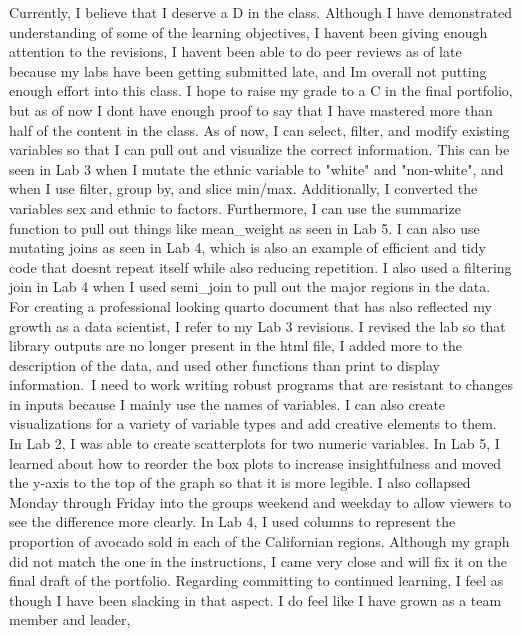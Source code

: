 \documentclass[
  letterpaper,
  DIV=11,
  numbers=noendperiod]{scrartcl}
\begin{document}
Currently, I believe that I deserve a D in the class. Although I have
demonstrated understanding of some of the learning objectives, I
haven\textquotesingle t been giving enough attention to the revisions, I
haven\textquotesingle t been able to do peer reviews as of late because
my labs have been getting submitted late, and I\textquotesingle m
overall not putting enough effort into this class. I hope to raise my
grade to a C in the final portfolio, but as of now I
don\textquotesingle t have enough proof to say that I have mastered more
than half of the content in the class. As of now, I can select, filter,
and modify existing variables so that I can pull out and visualize the
correct information. This can be seen in Lab 3 when I mutate the ethnic
variable to "white" and "non-white", and when I use filter, group by,
and slice min/max. Additionally, I converted the variables sex and
ethnic to factors. Furthermore, I can use the summarize function to pull
out things like mean\_weight as seen in Lab 5. I can also use mutating
joins as seen in Lab 4, which is also an example of efficient and tidy
code that doesn\textquotesingle t repeat itself while also reducing
repetition. I also used a filtering join in Lab 4 when I used semi\_join
to pull out the major regions in the data. For creating a professional
looking quarto document that has also reflected my growth as a data
scientist, I refer to my Lab 3 revisions. I revised the lab so that
library outputs are no longer present in the html file, I added more to
the description of the data, and used other functions than print to
display information.~I need to work writing robust programs that are
resistant to changes in inputs because I mainly use the names of
variables. I can also create visualizations for a variety of variable
types and add creative elements to them. In Lab 2, I was able to create
scatterplots for two numeric variables. In Lab 5, I learned about how to
reorder the box plots to increase insightfulness and moved the y-axis to
the top of the graph so that it is more legible. I also collapsed Monday
through Friday into the groups
\textquotesingle weekend\textquotesingle{} and
\textquotesingle weekday\textquotesingle{} to allow viewers to see the
difference more clearly. In Lab 4, I used columns to represent the
proportion of avocado sold in each of the Californian regions. Although
my graph did not match the one in the instructions, I came very close
and will fix it on the final draft of the portfolio. Regarding
committing to continued learning, I feel as though I have been slacking
in that aspect. I do feel like I have grown as a team member and leader,
\end{document}
